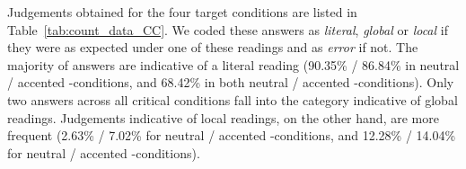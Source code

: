 \documentclass[fleqn,reqno,10pt,draft]{article}
\newcommand{\as}{\acro{as}}
\renewcommand{\es}{\acro{es}}
\begin{document}

%

Judgements obtained for the four target conditions are listed in
Table~\ref{tab:count_data_CC}. We coded these answers as {\it
  literal}, {\it global} or {\it local} if they were as expected under
one of these readings and as {\it error} if not. The majority of
answers are indicative of a literal reading (90.35\% / 86.84\% in
neutral / accented \as-conditions, and 68.42\% in both neutral /
accented \es-conditions). Only two answers across all critical
conditions fall into the category indicative of global
readings. Judgements indicative of local readings, on the other hand,
are more frequent (2.63\% / 7.02\% for neutral / accented
\as-conditions, and 12.28\% / 14.04\% for neutral / accented
\es-conditions).
\end{document}
